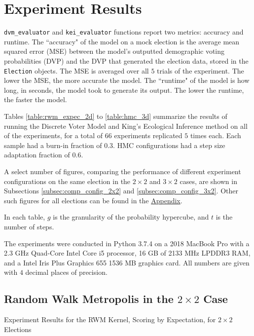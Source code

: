 \FloatBarrier
\section{Experiment Results}
\label{sec:exper_results}

 \texttt{dvm\_evaluator} and \texttt{kei\_evaluator} functions report two metrics: accuracy and runtime. The ``accuracy" of the model on a mock election is the average mean squared error (MSE) between the model's outputted demographic voting probabilities (DVP) and the DVP that generated the election data, stored in the \texttt{Election} objects. The MSE is averaged over all $5$ trials of the experiment. The lower the MSE, the more accurate the model. The ``runtime" of the model is how long, in seconds, the model took to generate its output. The lower the runtime, the faster the model.

Tables \ref{table:rwm_expec_2d} to \ref{table:hmc_3d} summarize the results of running the Discrete Voter Model and King's Ecological Inference method on all of the experiments, for a total of $66$ experiments replicated $5$ times each. Each sample had a burn-in fraction of $0.3$. HMC configurations had a step size adaptation fraction of $0.6$.

A select number of figures, comparing the performance of different experiment configurations on the same election in the $2 \times 2$ and $3 \times 2$ cases, are shown in Subsections \ref{subsec:comp_config_2x2} and \ref{subsec:comp_config_3x2}. Other such figures for all elections can be found in the \hyperref[chap:appendix]{Appendix}.

In each table, $g$ is the granularity of the probability hypercube, and $t$ is the number of steps.

The experiments were conducted in Python 3.7.4 on a 2018 MacBook Pro with a 2.3 GHz Quad-Core Intel Core i5 processor, 16 GB of 2133 MHz LPDDR3 RAM, and a Intel Iris Plus Graphics 655 1536 MB graphics card. All numbers are given with $4$ decimal places of precision.

\subsection{Random Walk Metropolis in the $2 \times 2$ Case}

\begin{table}[ht]
  \centering
  \caption{Experiment Results for the RWM Kernel, Scoring by Expectation, for $2 \times 2$ Elections}
  \label{table:rwm_expec_2d}
  
\end{table}


